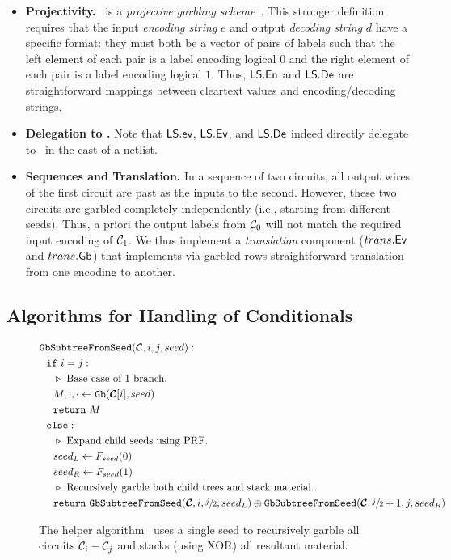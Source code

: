 \begin{itemize}
  \item \textbf{Projectivity.} \ourschemelong\
    is a \emph{projective garbling scheme}~\cite{CCS:BelHoaRog12}.
    This stronger definition requires that the input \emph{encoding string}
    $e$ and output \emph{decoding string} $d$ have a specific format:
    they must both be a vector of pairs of labels such that the left
    element of each pair is a label encoding logical $0$ and the right
    element of each pair is a label encoding logical $1$.
    Thus, $\textsf{LS}.\textsf{En}$ and $\textsf{LS}.\textsf{De}$ are straightforward
    mappings between cleartext values and encoding/decoding strings.
  \item \textbf{Delegation to \underscheme.} Note that
    $\textsf{LS}.\textsf{ev}$, $\textsf{LS}.\textsf{Ev}$, and $\textsf{LS}.\textsf{De}$ indeed
    directly delegate to \underscheme\ in the cast of a netlist.
  \item \textbf{Sequences and Translation.} In a sequence of two
    circuits, all output wires of the first circuit are past as the inputs
    to the second. However, these two circuits are garbled completely
    independently (i.e., starting from different seeds). Thus, a
    priori the output labels from $\mathcal C_0$ will not match the required
    input encoding of $\mathcal C_1$.
    We thus implement a \emph{translation} component ($trans.\textsf{Ev}$
    and $trans.\textsf{Gb}$) that implements via garbled rows
    straightforward translation from one encoding to another.
\end{itemize}

\subsection{Algorithms for Handling of Conditionals}\label{sec:approach-cond}

\begin{figure}
  \begin{align*}
    &\gbtree(\vec{\cir}, i, j, seed):\\
    &~~\cif~i = j:\\
    &~~~~\codecomment{Base case of $1$ branch.}\\
    &~~~~M, \cdot, \cdot \gets \gb(\vec\cir[i], seed)\\
    &~~~~\creturn~M\\
    &~~\celse:\\
    &~~~~\codecomment{Expand child seeds using PRF.}\\
    &~~~~seed_L \gets F_{seed}(0)\\
    &~~~~seed_R \gets F_{seed}(1)\\
    &~~~~\codecomment{Recursively garble both child trees and stack
    material.}\\
    &~~~~\creturn~\gbtree(\vec{\cir}, i, \sfrac{j}{2}, seed_L) \oplus
    \gbtree(\vec{\cir}, \sfrac{j}{2} + 1, j, seed_R)\\
  \end{align*}
  \caption{%
    The helper algorithm \gbtree\ uses a single seed to recursively
    garble all circuits $\mathcal C_i - \mathcal C_j$ and stacks (using XOR) all
    resultant material.
  }\label{fig:gbtree}
\end{figure}


